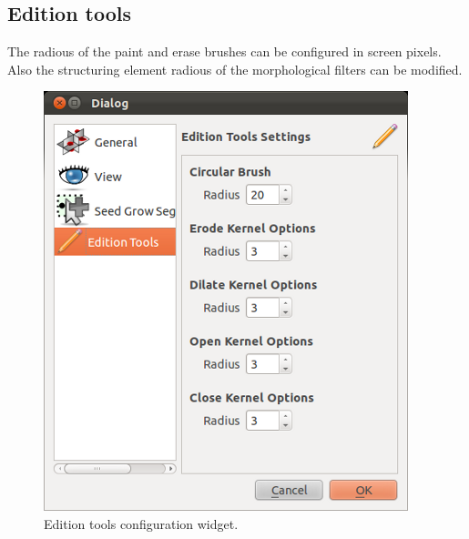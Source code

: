\subsection{Edition tools}

The radious of the paint and erase brushes can be configured in screen pixels. Also the structuring element radious of the morphological filters can be modified. 

\begin{figure}[H]
\centering
\includegraphics[scale=0.65]{fig/Configuration-edit}
\caption{Edition tools configuration widget.}
\end{figure}


